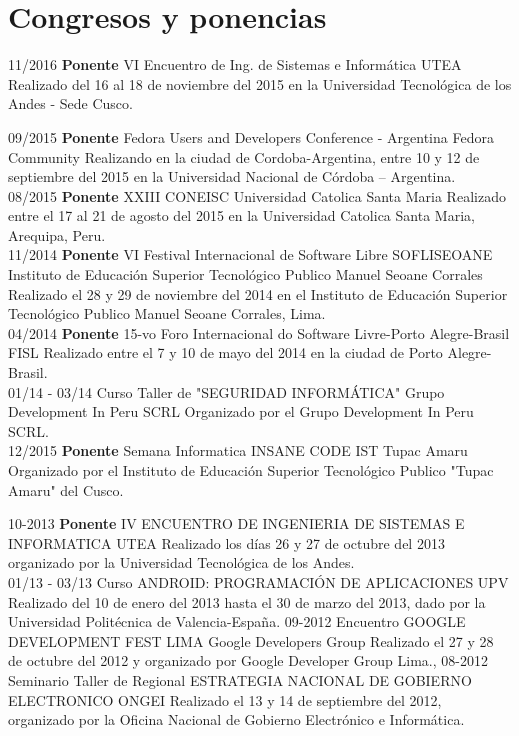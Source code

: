 \documentclass[]{friggeri-cv}
\begin{document}
\section{Congresos y ponencias}
\begin{entrylist}
  \entry
    {11/2016}
    {\textbf{Ponente} VI Encuentro de Ing. de Sistemas e Inform\'atica }
    {UTEA}
    {Realizado del 16 al 18 de noviembre del 2015 en la Universidad Tecnológica de los Andes - Sede Cusco.\\}
\end{entrylist}
\begin{entrylist}
    \entry
    {09/2015}
    {\textbf{Ponente} Fedora Users and Developers Conference - Argentina}
    {Fedora Community}
    {Realizando en la ciudad de Cordoba-Argentina, entre 10 y 12 de septiembre
    del 2015 en la Universidad Nacional de C\'ordoba – Argentina.\\}
    \entry
    {08/2015}
    {\textbf{Ponente} {XXIII CONEISC}}
    {Universidad Catolica Santa Maria}
    {Realizado entre el 17 al 21 de agosto del 2015 en la Universidad Catolica Santa Maria, Arequipa, Peru.\\}
    \entry
    {11/2014}
    {\textbf{Ponente} VI Festival Internacional de Software Libre SOFLISEOANE}
    {Instituto de Educaci\'on Superior Tecnol\'ogico Publico Manuel Seoane Corrales}
    {Realizado el 28 y 29 de noviembre del 2014 en el Instituto de Educaci\'on Superior
    Tecnol\'ogico Publico Manuel Seoane Corrales, Lima.\\}
    \entry
    {04/2014}
    {\textbf{Ponente} 15-vo Foro Internacional do Software Livre-Porto Alegre-Brasil}
    {FISL}
    {Realizado entre el 7 y 10 de mayo del 2014 en la ciudad de Porto Alegre-Brasil.\\}
    \entry
    {01/14 - 03/14}
    {Curso Taller de "SEGURIDAD INFORM\'ATICA"}
    {Grupo Development In Peru SCRL}
    {Organizado por el Grupo Development In Peru SCRL.\\}
    \entry
    {12/2015}
    {\textbf{Ponente} Semana Informatica INSANE CODE}
    {IST Tupac Amaru}
    {Organizado por el Instituto de Educaci\'on Superior Tecnol\'ogico Publico "Tupac
    Amaru" del Cusco.}
\end{entrylist}
\begin{entrylist}
    \entry
    {10-2013}
    {\textbf{Ponente} IV ENCUENTRO DE INGENIERIA DE SISTEMAS E INFORMATICA}
    {UTEA}
    {Realizado los d\'ias 26 y 27 de octubre del 2013 organizado por la Universidad
    Tecnol\'ogica de los Andes.\\}
    \entry
    {01/13 - 03/13}
    {Curso ANDROID{:} PROGRAMACI\'ON DE APLICACIONES}
    {UPV}
    {Realizado del 10 de enero del 2013 hasta el 30 de marzo del 2013, dado por
    la Universidad Polit\'ecnica de Valencia-Espa\~na.}
    \entry
    {09-2012}
    {Encuentro GOOGLE DEVELOPMENT FEST LIMA}
    {Google Developers Group}
    {Realizado el 27 y 28 de octubre del 2012 y organizado por Google Developer Group Lima.},
    \entry
    {08-2012}
    {Seminario Taller de Regional ESTRATEGIA NACIONAL DE GOBIERNO ELECTRONICO}
    {ONGEI}
    {Realizado el 13 y 14 de septiembre del 2012, organizado por la Oficina
    Nacional de Gobierno Electr\'onico e Inform\'atica.}
\end{entrylist}
\end{document}
